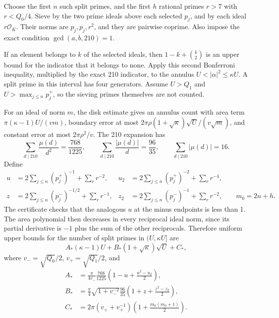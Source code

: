 \documentclass[11pt]{article}
\newcommand{\OK}{\mathcal O_K}
\begin{document}
Choose the first \(n\) such split primes, and the first \(h\) rational
primes \(r>7\) with \(r<Q_0/4\). Sieve by the two prime ideals above
each selected \(p_j\), and by each ideal \(r\OK\). Their norms are
\(p_j,p_j,r^2\), and they are pairwise coprime. Also impose the exact
condition \(\gcd(a,b,210)=1\).

If an element belongs to \(k\) of the selected ideals, then
\(1-k+\binom{k}{2}\) is an upper bound for the indicator that it
belongs to none. Apply this second Bonferroni inequality, multiplied
by the exact 210 indicator, to the annulus
\(U<|\alpha|^2\le\kappa U\). A split prime in this interval has four
generators. Assume \(U>Q_1\) and \(U>\max_{j\le n}p_j^+\), so the
sieving primes themselves are not counted.

For an ideal of norm \(m\), the disk estimate gives an annulus count
with area term \(\pi(\kappa-1)U/(vm)\), boundary error at most
\(2\pi\rho(1+\sqrt\kappa)\sqrt U/(v\sqrt m)\), and constant error
at most \(2\pi\rho^2/v\). The 210 expansion has
\[
 \sum_{d\mid210}\frac{\mu(d)}{d^2}=\frac{768}{1225},\qquad
 \sum_{d\mid210}\frac{|\mu(d)|}{d}=\frac{96}{35},\qquad
 \sum_{d\mid210}|\mu(d)|=16.
\]
Define
\begin{align*}
 u&=2\sum_{j\le n}(p_j^+)^{-1}+\sum_{r}r^{-2},&
 u_2&=2\sum_{j\le n}(p_j^+)^{-2}+\sum_r r^{-4},\\
 z&=2\sum_{j\le n}(p_j^-)^{-1/2}+\sum_r r^{-1},&
 z_2&=2\sum_{j\le n}(p_j^-)^{-1}+\sum_r r^{-2},
 \qquad m_0=2n+h.
\end{align*}
The certificate checks that the analogous \(u\) at the minus endpoints
is less than 1. The area polynomial then decreases in every reciprocal
ideal norm, since its partial derivative is \(-1\) plus the sum of
the other reciprocals. Therefore uniform upper bounds for the number
of split primes in \((U,\kappa U]\) are
\begin{equation}\label{split-annulus}
 A_*(\kappa-1)U+B_*(1+\sqrt\kappa)\sqrt U+C_*,
\end{equation}
where \(v_-=\sqrt{Q_0}/2\), \(v_+=\sqrt{Q_1}/2\), and
\begin{align*}
 A_*&=\frac{\pi}{4v_-}\frac{768}{1225}
          \left(1-u+\frac{u^2-u_2}{2}\right),\\
 B_*&=\frac\pi4\sqrt{1+v_-^{-2}}\frac{96}{35}
          \left(1+z+\frac{z^2-z_2}{2}\right),\\
 C_*&=2\pi(v_++v_+^{-1})
          \left(1+\frac{m_0(m_0+1)}2\right).
\end{align*}
\end{document}
